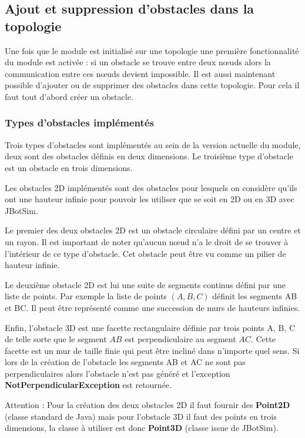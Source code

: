 \documentclass{article}
\begin{document}
\subsection{Ajout et suppression d'obstacles dans la topologie}
Une fois que le module est initialisé sur une topologie une première fonctionnalité du module est activée : si un obstacle se trouve entre deux n\oe uds alors la communication entre ces n\oe uds devient impossible. Il est aussi maintenant possible d'ajouter ou de supprimer des obstacles dans cette topologie. Pour cela il faut tout d'abord créer un obstacle. 

\subsubsection{Types d'obstacles implémentés}
Trois types d'obstacles sont implémentés au sein de la version actuelle du module, deux sont des obstacles définis en deux dimensions. Le troisième type d'obstacle est un obstacle en trois dimensions.\medskip

Les obstacles 2D implémentés sont des obstacles pour lesquels on considère qu'ils ont une hauteur infinie pour pouvoir les utiliser que se soit en 2D ou en 3D avec JBotSim.\medskip

Le premier des deux obstacles 2D est un obstacle circulaire défini par un centre et un rayon. Il est important de noter qu'aucun n\oe ud n'a le droit de se trouver à l'intérieur de ce type d'obstacle. Cet obstacle peut être vu comme un pilier de hauteur infinie.\medskip

Le deuxième obstacle 2D est lui une suite de segments continus défini par une liste de points. Par exemple la liste de points $(A,B,C)$ définit les segments AB et BC. Il peut être représenté comme une succession de murs de hauteurs infinies.\medskip

Enfin, l'obstacle 3D est une facette rectangulaire définie par trois points A, B, C de telle sorte que le segment $AB$ est perpendiculaire au segment $AC$. Cette facette est un mur de taille finie qui peut être incliné dans n'importe quel sens. Si lors de la création de l'obstacle les segments AB et AC ne sont pas perpendiculaires alors l'obstacle n'est pas généré et l'exception \textbf{NotPerpendicularException} est retournée.\medskip

Attention : Pour la création des deux obstacles 2D il faut fournir des \textbf{Point2D} (classe standard de Java)  mais pour l'obstacle 3D il faut des points en trois dimensions, la classe à utiliser est donc \textbf{Point3D} (classe issue de JBotSim).\\%
\end{document}
